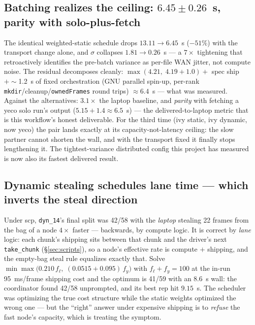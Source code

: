 \documentclass[
	english,
	letterpaper, oneside
]{article}
\begin{document}
\subsection{Batching realizes the ceiling: $6.45\pm0.26$~s, parity with solo-plus-fetch}
\label{sec:batching}

The identical weighted-static schedule drops $13.11 \to 6.45$~s
($-51\%$) with the transport change alone, and $\sigma$ collapses
$1.81 \to 0.26$~s --- a $7\times$ tightening that retroactively
identifies the pre-batch variance as per-file WAN jitter, not compute
noise. The residual decomposes cleanly: $\max(4.21,\; 4.19 + 1.0) + $
spec ship $+ \sim$1.2~s of fixed orchestration (GNU parallel spin-up,
per-rank \texttt{mkdir}/cleanup/\texttt{ownedFrames} round trips)
$\approx 6.4$~s --- what was measured. Against the alternatives:
$3.1\times$ the laptop baseline, and \emph{parity} with fetching a yeco
solo run's output ($5.15 + 1.4 \approx 6.5$~s) --- the delivered-to-laptop
metric that is this workflow's honest deliverable. For the third time
(ivy static, ivy dynamic, now yeco) the pair lands exactly at its
capacity-not-latency ceiling: the slow partner cannot shorten the wall,
and with the transport fixed it finally stops lengthening it. The
tightest-variance distributed config this project has measured is now
also its fastest delivered result.

\subsection{Dynamic stealing schedules lane time --- which inverts the steal direction}
\label{sec:lanetime}

Under scp, \texttt{dyn\_14}'s final split was 42/58 with the
\emph{laptop} stealing 22 frames from the bag of a node $4\times$ faster
--- backwards, by compute logic. It is correct by \emph{lane} logic: each
chunk's shipping sits between that chunk and the driver's next
\texttt{take\_chunk} (\S\ref{sec:scripts}), so a node's effective rate
is compute $+$ shipping, and the empty-bag steal rule equalizes exactly
that. Solve $\min\max\bigl(0.210\,f_\ell,\;(0.0515+0.095)\,f_y\bigr)$
with $f_\ell+f_y=100$ at the in-run 95~ms/frame shipping cost and the
optimum is 41/59 with an $8.6$~s wall: the coordinator found 42/58
unprompted, and its best rep hit $9.15$~s. The scheduler was optimizing
the true cost structure while the static weights optimized the wrong one
--- but the ``right'' answer under expensive shipping is to \emph{refuse}
the fast node's capacity, which is treating the symptom.
\end{document}
